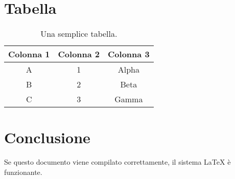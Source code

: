\documentclass[12pt,a4paper]{article}
\begin{document}
\section{Tabella}
\begin{table}[h]
    \centering
    \begin{tabular}{|c|c|c|}
        \hline
        \textbf{Colonna 1} & \textbf{Colonna 2} & \textbf{Colonna 3} \\
        \hline
        A & 1 & Alpha \\
        B & 2 & Beta \\
        C & 3 & Gamma \\
        \hline
    \end{tabular}
    \caption{Una semplice tabella.}
    \label{tab:esempio}
\end{table}

\section{Conclusione}
Se questo documento viene compilato correttamente, il sistema LaTeX è funzionante.
\end{document}
